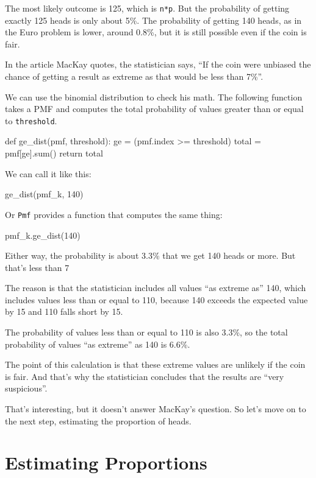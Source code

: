 \documentclass[12pt]{book}
\theoremstyle{exercise}
\newcommand{\py}[1]{{\tt #1}}%
\begin{document}
The most likely outcome is 125, which is \py{n*p}.
But the probability of getting exactly 125 heads is only about 5\%.
The probability of getting 140 heads, as in the Euro problem is lower, around 0.8\%, but it is still possible even if the coin is fair.

In the article MacKay quotes, the statistician says, ``If the coin were unbiased the chance of getting a result as extreme as that would be less than 7\%''.

We can use the binomial distribution to check his math.  The following function takes a PMF and computes the total probability of values greater than or equal to \py{threshold}.

\begin{code}
def ge_dist(pmf, threshold):
    ge = (pmf.index >= threshold)
    total = pmf[ge].sum()
    return total
\end{code}

We can call it like this:

\begin{code}
ge_dist(pmf_k, 140)
\end{code}

Or \py{Pmf} provides a function that computes the same thing:

\begin{code}
pmf_k.ge_dist(140)
\end{code}

Either way, the probability is about 3.3\% that we get 140 heads or more.
But that's less than 7%

The reason is that the statistician includes all values ``as extreme as'' 140, which includes values less than or equal to 110, because 140 exceeds the expected value by 15 and 110 falls short by 15.

The probability of values less than or equal to 110 is also 3.3\%,
so the total probability of values ``as extreme'' as 140 is 6.6\%.

The point of this calculation is that these extreme values are unlikely if the coin is fair.
And that's why the statistician concludes that the results are ``very suspicious''.

That's interesting, but it doesn't answer MacKay's question.  So let's move on to the next step, estimating the proportion of heads.


\section{Estimating Proportions}
\label{estprop}
\end{document}
